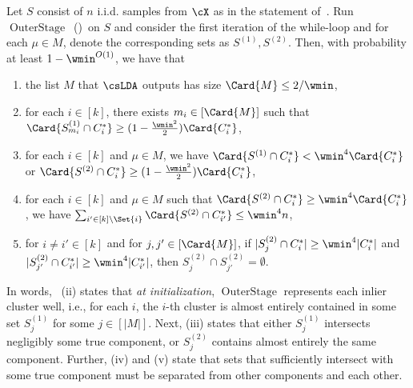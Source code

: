 \begin{theorem}
    \label{thm:outer-stage-init-guarantees}
    Let \(S\) consist of \(n\) i.i.d. samples from \(\cX\) as in the statement of~. 
    Run~\(\operatorname{OuterStage}\)~()~on \(S\) and consider the first iteration of the while-loop and for each $\mu \in M$, denote the corresponding sets as $S^{(1)}, S^{(2)}$. 
    Then, with probability at least \(1 - \wmin^{O(1)}\), we have that
    \begin{enumerate}[label=(\roman*),ref={\theassumption~(\roman*)}]
        \item \label{item:M_small} the list $M$ that \(\csLDA\) outputs has size \(\Card{M} \leq 2 / \wmin\), 
        \item \label{item:outer_stage_large_S_mi} for each \(i \in [k]\), there exists \(m_i \in [\Card{M}]\)
        such that \(\Card{S_{m_i}^{(1)} \cap C_i^*} \geq (1 - \frac{\wmin^2}{2}) \Card{C_i^*}\),
        \item \label{item:first_iter_small_or_large} for each \(i \in [k]\) and \( \mu \in M\), we have $\Card{S^{(1)} \cap C^*_i} < \wmin^4 \Card{C_i^*}$ or $\Card{S^{(2)} \cap C_i^*} \geq (1-\frac{\wmin^2}{2}) \Card{C_i^*}$,
        \item \label{item:outer_stage_S_mi_no_others} for each \(i \in [k]\) and \( \mu \in M\) such that $\Card{S^{(2)} \cap C^*_i} \geq \wmin^4 \Card{C^*_i}$, we have  \(\sum_{i' \in [k] \setminus \Set{i}}\Card{S^{(2)} \cap C^*_{i'}} \leq \wmin^4 n\),
        \item \label{item:outer_stage_S_mi_nonitersect} for \(i \neq i' \in [k]\) and for \(j, j' \in [\Card{M}]\), if $|S_j^{(2)} \cap C^*_i| \geq \wmin^4|C^*_i|$ and $|S_{j'}^{(2)} \cap C^*_{i'}| \geq \wmin^4 |C^*_{i'}|$, then $S_j^{(2)} \cap S_{j'}^{(2)} = \emptyset$.
    \end{enumerate}
\end{theorem}

In words,~ (ii) states that \emph{at initialization}, \(\operatorname{OuterStage}\) represents each inlier cluster well, i.e., for each $i$, the \(i\)-th cluster is almost entirely contained in some set \(S^{(1)}_{j}\) for some $j\in[|M|]$. Next, (iii) states that either \(S^{(1)}_j\) intersects negligibly some true component, or \(S^{(2)}_j\) contains almost entirely the same component. Further, (iv) and (v) state that sets that sufficiently intersect with some true component
must be separated from other components and each other.

